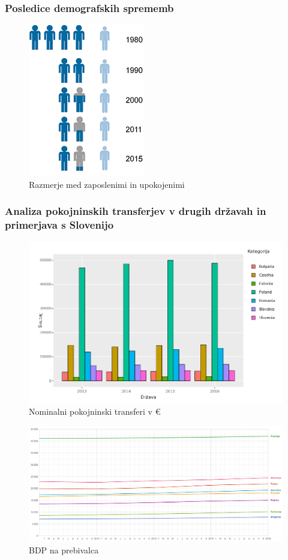 \documentclass[10pt]{beamer}
\begin{document}
\begin{frame}
\frametitle{Posledice demografskih sprememb}
\begin{figure}[h!]
\centering
\includegraphics[width = 5 cm]{razmerje_med_zaposlenimi_in_upokojenimi_2015.png}
\caption{Razmerje med zaposlenimi in upokojenimi}
\label{Slika 8}
\end{figure}
\end{frame}


\begin{frame}
\frametitle{Analiza pokojninskih transferjev v drugih državah in primerjava s Slovenijo}
\begin{figure}[h!]
\centering
\includegraphics[width = 10 cm]{pokojnine_nominalno.png}
\caption{Nominalni pokojninski transferi v \euro}
\label{Slika 9}
\end{figure}
\end{frame}

\begin{frame}
\begin{figure}[h!]
\centering
\includegraphics[width = 12 cm]{bdp_per_capita.png}
\caption{BDP na prebivalca}
\label{Slika 10}
\end{figure}
\end{frame}
\end{document}
